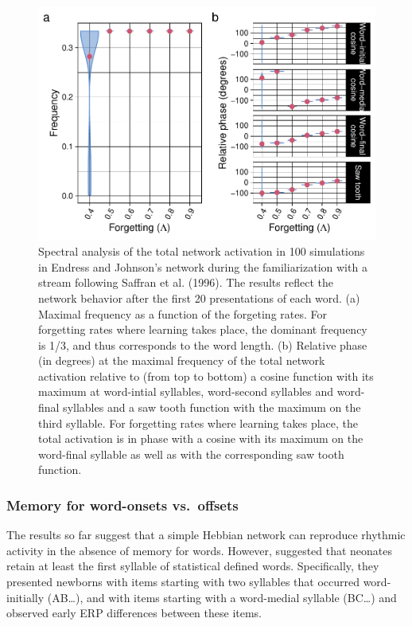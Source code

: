\documentclass[
]{article}
\begin{document}
\begin{figure}
\includegraphics[width=1\linewidth]{tp_model_entrainment_files/figure-latex/basic-experiment-global-print-freq-phase-plot-1} \caption{Spectral analysis of the total network activation in 100 simulations in Endress and Johnson's network during the familiarization with a stream following Saffran et al. (1996). The results reflect the network behavior after the first 20 presentations of each word. (a) Maximal frequency as a function of the forgeting rates. For forgetting rates where learning takes place, the dominant frequency is 1/3, and thus corresponds to the word length. (b) Relative phase (in degrees) at the maximal frequency of the total network activation relative to (from top to bottom) a cosine function with its maximum at word-intial syllables, word-second syllables and word-final syllables and a saw tooth function with the maximum on the third syllable. For forgetting rates where learning takes place, the total activation is in phase with a cosine with its maximum on the word-final syllable as well as with the corresponding saw tooth function.}\label{fig:basic-experiment-global-print-freq-phase-plot}
\end{figure}

\hypertarget{memory-for-word-onsets-vs.-offsets-flo2022}{%
\subsubsection{\texorpdfstring{Memory for word-onsets vs.~offsets
\citep{Flo2022}}{Memory for word-onsets vs.~offsets {[}@Flo2022{]}}}\label{memory-for-word-onsets-vs.-offsets-flo2022}}

The results so far suggest that a simple Hebbian network can reproduce
rhythmic activity in the absence of memory for words. However,
\citep{Flo2022} suggested that neonates retain at least the first
syllable of statistical defined words. Specifically, they presented
newborns with items starting with two syllables that occurred
word-initially (AB\ldots), and with items starting with a word-medial
syllable (BC\ldots) and observed early ERP differences between these
items.
\end{document}
